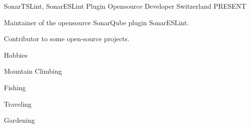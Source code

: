 

\begin{cventries}

  \cventry
    {SonarTSLint, SonarESLint Plugin} %
    {Opensource Developer} %
    {Switzerland} %
    {PRESENT} %
    {
      \begin{cvitems} %
        \item {Maintainer of the opensource SonarQube plugin SonarESLint.}
		\item {Contributor to some open-source projects.}
      \end{cvitems}
    }

  \cventry
{Hobbies} %
{} %
{} %
{} %
{
	\begin{cvitems} %
		\item {Mountain Climbing}
		\item {Fishing}
		\item {Traveling}
		\item {Gardening}		
	\end{cvitems}
}

\end{cventries}
